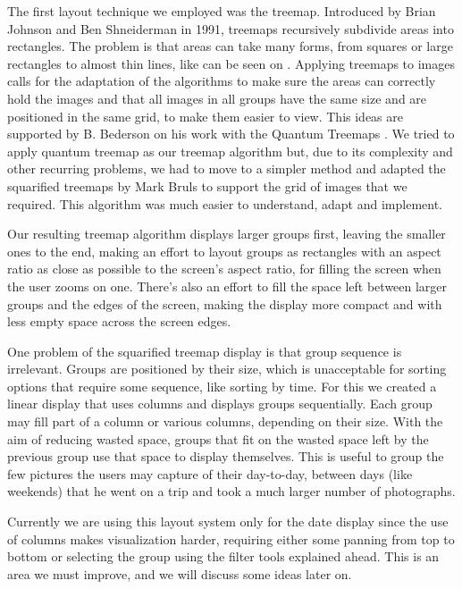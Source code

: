 The first layout technique we employed was the treemap. Introduced by Brian Johnson and Ben Shneiderman \cite{Johnson:1991:TSA:949607.949654} in 1991, treemaps recursively subdivide areas into rectangles. The problem is that areas can take many forms, from squares or large rectangles to almost thin lines, like can be seen on . Applying treemaps to images calls for the adaptation of the algorithms to make sure the areas can correctly hold the images and that all images in all groups have the same size and are positioned in the same grid, to make them easier to view. This ideas are supported by B. Bederson on his work with the Quantum Treemaps \cite{Bederson:2001:PZI:502348.502359}. We tried to apply quantum treemap as our treemap algorithm but, due to its complexity and other recurring problems, we had to move to a simpler method and adapted the squarified treemaps \cite{Bruls:2000p3517} by Mark Bruls to support the grid of images that we required. This algorithm was much easier to understand, adapt and implement.

Our resulting treemap algorithm displays larger groups first, leaving the smaller ones to the end, making an effort to layout groups as rectangles with an aspect ratio as close as possible to the screen's aspect ratio, for filling the screen when the user zooms on one. There's also an effort to fill the space left between larger groups and the edges of the screen, making the display more compact and with less empty space across the screen edges.

One problem of the squarified treemap display is that group sequence is irrelevant. Groups are positioned by their size, which is unacceptable for sorting options that require some sequence, like sorting by time. For this we created a linear display  that uses columns and displays groups sequentially. Each group may fill part of a column or various columns, depending on their size. With the aim of reducing wasted space, groups that fit on the wasted space left by the previous group use that space to display themselves. This is useful to group the few pictures the users may capture of their day-to-day, between days (like weekends) that he went on a trip and took a much larger number of photographs.

Currently we are using this layout system only for the date display since the use of columns makes visualization harder, requiring either some panning from top to bottom or selecting the group using the filter tools explained ahead. This is an area we must improve, and we will discuss some ideas later on.


